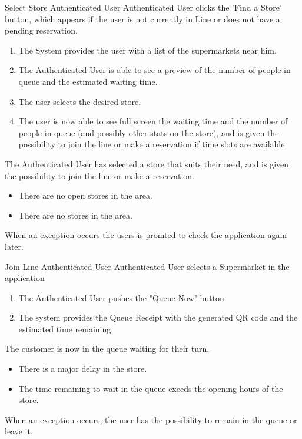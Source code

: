 \usecase
{Select Store}
{Authenticated User}
{Authenticated User clicks the 'Find a Store' button, which appears if the user is not currently in Line or does not have a pending reservation.}
{
        \begin{enumerate}
            \item The System provides the user with a list of the supermarkets near him.
            \item The Authenticated User is able to see a preview of the number of people in queue and the estimated waiting time. 
            \item The user selects the desired store. 
            \item The user is now able to see full screen the waiting time and the number of people in queue (and possibly other stats on the store), and is given the possibility to join the line or make a reservation if time slots are available.  
        \end{enumerate}
}
{
    The Authenticated User has selected a store that suits their need, and is given the possibility to join the line or make a reservation. 
}
{
    \begin{itemize}
        \item There are no open stores in the area. 
        \item There are no stores in the area. 
    \end{itemize}
}
{
    When an exception occurs the users is promted to check the application again later. 
}

\usecase
{Join Line}
{Authenticated User}
{Authenticated User selects a Supermarket in the application}
{
        \begin{enumerate}
            \item The Authenticated User pushes the "Queue Now" button.
            \item The system provides the Queue Receipt with the generated QR code and the estimated time remaining.
        \end{enumerate}
}
{
    The customer is now in the queue waiting for their turn.
}
{
    \begin{itemize}
        \item There is a major delay in the store. 
        \item The time remaining to wait in the queue exeeds the opening hours of the store. 
    \end{itemize}
}
{
    When an exception occurs, the user has the possibility to remain in the queue or leave it. 
}


